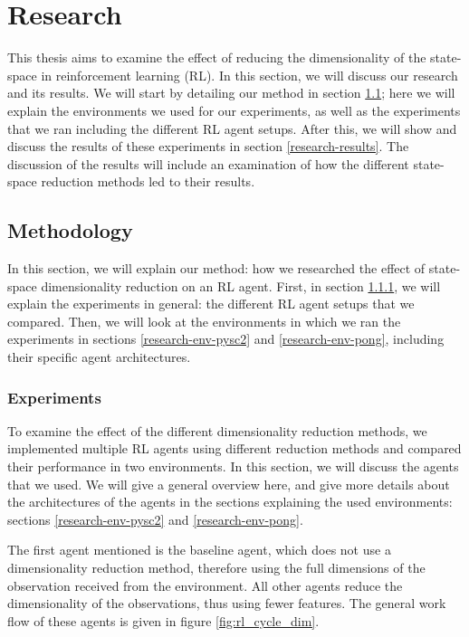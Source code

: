 \chapter{Research}\label{research}
This thesis aims to examine the effect of reducing the dimensionality of the state-space in reinforcement learning (RL). In this section, we will discuss our research and its results. We will start by detailing our method in section \ref{research-method}; here we will explain the environments we used for our experiments, as well as the experiments that we ran including the different RL agent setups. After this, we will show and discuss the results of these experiments in section \ref{research-results}. The discussion of the results will include an examination of how the different state-space reduction methods led to their results.

\section{Methodology}\label{research-method}
In this section, we will explain our method: how we researched the effect of state-space dimensionality reduction on an RL agent. First, in section \ref{research-exp}, we will explain the experiments in general: the different RL agent setups that we compared. Then, we will look at the environments in which we ran the experiments in sections \ref{research-env-pysc2} and \ref{research-env-pong}, including their specific agent architectures.

\subsection{Experiments}\label{research-exp}
To examine the effect of the different dimensionality reduction methods, we implemented multiple RL agents using different reduction methods and compared their performance in two environments. In this section, we will discuss the agents that we used. We will give a general overview here, and give more details about the architectures of the agents in the sections explaining the used environments: sections \ref{research-env-pysc2} and \ref{research-env-pong}.

The first agent mentioned is the baseline agent, which does not use a dimensionality reduction method, therefore using the full dimensions of the observation received from the environment. All other agents reduce the dimensionality of the observations, thus using fewer features. The general work flow of these agents is given in figure \ref{fig:rl_cycle_dim}.

